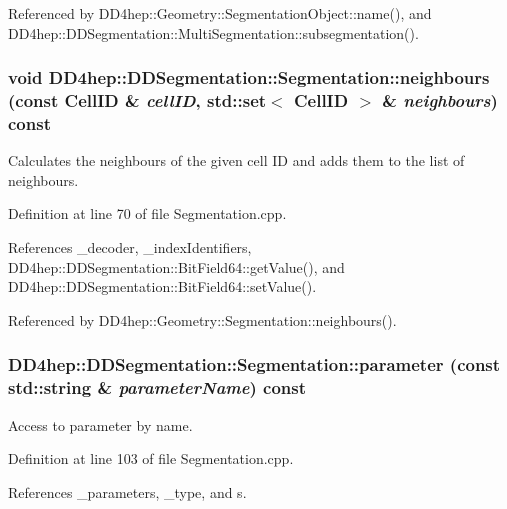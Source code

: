 Referenced by DD4hep::Geometry::SegmentationObject::name(), and DD4hep::DDSegmentation::MultiSegmentation::subsegmentation().\hypertarget{class_d_d4hep_1_1_d_d_segmentation_1_1_segmentation_af91b751e26aed9cf2a2e80d2b74c0544}{
\subsubsection[{neighbours}]{\setlength{\rightskip}{0pt plus 5cm}void DD4hep::DDSegmentation::Segmentation::neighbours (const {\bf CellID} \& {\em cellID}, \/  std::set$<$ {\bf CellID} $>$ \& {\em neighbours}) const}}
\label{class_d_d4hep_1_1_d_d_segmentation_1_1_segmentation_af91b751e26aed9cf2a2e80d2b74c0544}


Calculates the neighbours of the given cell ID and adds them to the list of neighbours. 

Definition at line 70 of file Segmentation.cpp.

References \_\-decoder, \_\-indexIdentifiers, DD4hep::DDSegmentation::BitField64::getValue(), and DD4hep::DDSegmentation::BitField64::setValue().

Referenced by DD4hep::Geometry::Segmentation::neighbours().\hypertarget{class_d_d4hep_1_1_d_d_segmentation_1_1_segmentation_a9de5d953004c571b739827f5f201f34d}{
\subsubsection[{parameter}]{ DD4hep::DDSegmentation::Segmentation::parameter (const std::string \& {\em parameterName}) const}}
\label{class_d_d4hep_1_1_d_d_segmentation_1_1_segmentation_a9de5d953004c571b739827f5f201f34d}


Access to parameter by name. 

Definition at line 103 of file Segmentation.cpp.

References \_\-parameters, \_\-type, and s.

